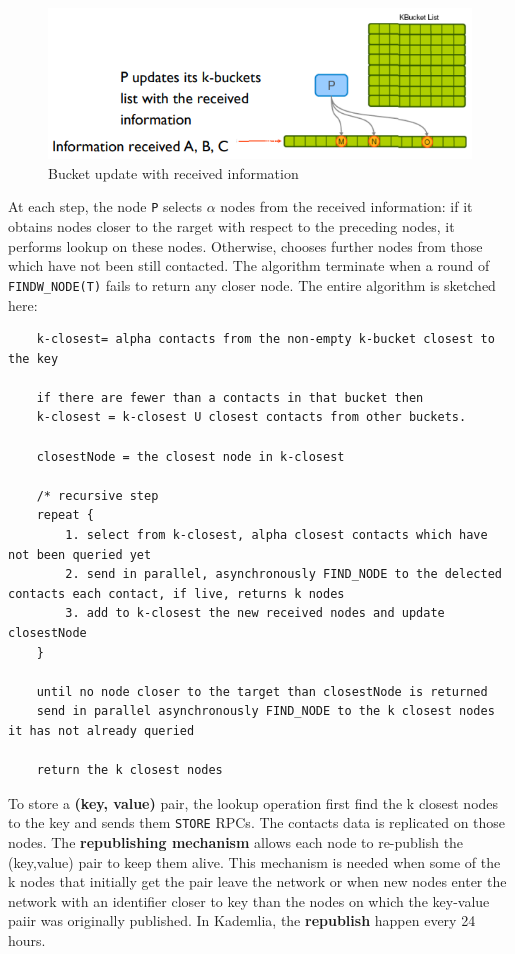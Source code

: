 \documentclass[10pt,a4paper]{report}
\begin{document}
\begin{figure}[h!]
	\centering
	\includegraphics[scale=0.60]{images/Pasted image 20230310114507.png}
	\caption{Bucket update with received information}
	\label{complete-lookup-2}

\end{figure}

At each step, the node \texttt{P} selects $\alpha$ nodes from the received information: if it obtains nodes closer to the rarget with respect to the preceding nodes, it performs lookup on these nodes. Otherwise, chooses further nodes from those which have not been still contacted.
The algorithm terminate when a round of \texttt{FINDW\_NODE(T)} fails to return any closer node.
The entire algorithm is sketched here:
\begin{verbatim}
	k-closest= alpha contacts from the non-empty k-bucket closest to the key 
	
	if there are fewer than a contacts in that bucket then 
	k-closest = k-closest U closest contacts from other buckets. 
	
	closestNode = the closest node in k-closest 
	
	/* recursive step 
	repeat {  
		1. select from k-closest, alpha closest contacts which have not been queried yet 
		2. send in parallel, asynchronously FIND_NODE to the delected contacts each contact, if live, returns k nodes 
		3. add to k-closest the new received nodes and update closestNode 
	}
	
	until no node closer to the target than closestNode is returned 
	send in parallel asynchronously FIND_NODE to the k closest nodes it has not already queried 
	
	return the k closest nodes
\end{verbatim}

To store a \textbf{(key, value)} pair, the lookup operation first find the k closest nodes to the key and sends them \texttt{STORE} RPCs. The contacts data is replicated on those nodes.
The \textbf{republishing mechanism} allows each node to re-publish the (key,value) pair to keep them alive. This mechanism is needed when some of the k nodes that initially get the pair leave the network or when new nodes enter the network with an identifier closer to key than the nodes on which the key-value paiir was originally published. In Kademlia, the \textbf{republish} happen every 24 hours.
\end{document}
